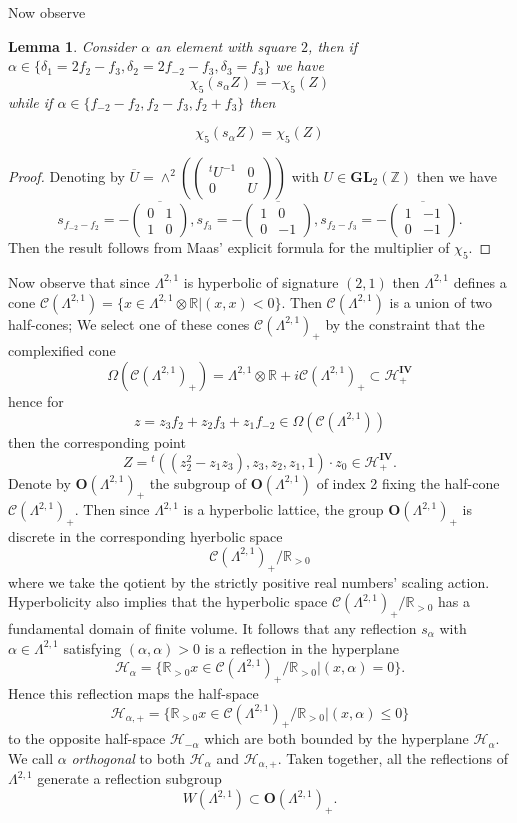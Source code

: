 \documentclass[9pt]{amsart} \usepackage[utf8]{inputenc}
\newtheorem{lemma}{Lemma}
\newcommand{\Z}{\mathbb{Z}} \newcommand{\C}{\mathbb{C}}
\newcommand{\R}{\mathbb{R}} \newcommand{\La}{\Lambda}
\newcommand{\GL}{\mathbf{GL}}
\newcommand{\Orth}{\mathbf{O}}
\newcommand{\Hpl}{\mathcal{H}}
\newcommand{\IV}{\mathbf{IV}}
\newcommand{\Cone}{\mathcal{C}}
\begin{document}
Now observe
\begin{lemma}
Consider $\alpha$ an element with square $2$, then if $\alpha \in
\{\delta_1 = 2f_2 -f_3, \delta_2 = 2f_{-2} - f_3, \delta_3 = f_3\}$ we
have
$$\chi_5(s_{\alpha}Z) = - \chi_5(Z)$$
while if $\alpha \in \{f_{-2} - f_2, f_2 - f_3, f_2 + f_3\}$ then

$$\chi_5(s_{\alpha}Z) = \chi_5(Z)$$
\end{lemma}
\begin{proof}
Denoting by $\overline{U} = \wedge^2(\begin{pmatrix}{}^tU^{-1} & 0\\ 0 &
U\end{pmatrix})$ with $U \in
\GL_2(\Z)$ then we have $$s_{f_{-2} - f_2} = -\overline{\begin{pmatrix}0
& 1\\ 1 &0\end{pmatrix}}, s_{f_3} = - \overline{\begin{pmatrix}1& 0\\  0
&-1\end{pmatrix}}, s_{f_2 - f_3} =
-\overline{\begin{pmatrix}1 & -1\\ 0 & -1\end{pmatrix}}.$$ Then the result follows from Maas' explicit
formula for the multiplier of $\chi_5.$
\end{proof}

Now observe that since $\La^{2,1}$ is hyperbolic of signature $(2,1)$
then $\La^{2,1}$ defines a cone $\Cone(\La^{2,1}) = \{ x \in \La^{2,1}
\otimes \R | (x,x) < 0\}$. Then $\Cone(\La^{2,1})$ is a union of two
half-cones; We select one of these cones $\Cone(\La^{2,1})_+$ by the
constraint that the complexified cone $$\Omega(\Cone(\La^{2,1})_+) = \La^{2,1} \otimes \R
+i\Cone(\La^{2,1})_+ \subset \Hpl^{\IV}_+$$ hence for $$z = z_3 f_2 + z_2
f_3 + z_1 f_{-2} \in \Omega(\Cone(\La^{2,1}))$$ then the corresponding
point $$Z = {}^t ((z_2^2 - z_1z_3), z_3, z_2, z_1, 1) \cdot z_0 \in
\Hpl^{\IV}_+.$$ Denote by $\Orth(\La^{2,1})_+$ the subgroup of
$\Orth(\La^{2,1})$ of index 2 fixing the half-cone
$\Cone(\Lambda^{2,1})_+$. Then since $\La^{2,1}$ is a hyperbolic
lattice, the group $\Orth(\La^{2,1})_+$ is discrete in the corresponding
hyerbolic space $$\Cone(\La^{2,1})_+ / \R_{>0}$$ where we take the
qotient by the strictly positive real numbers' scaling action.
Hyperbolicity also implies that the hyperbolic space
$\Cone(\La^{2,1})_+ / \R_{>0}$ has a fundamental domain of finite
volume. It follows that any reflection $s_{\alpha}$ with $\alpha \in
\La^{2,1}$ satisfying $(\alpha,\alpha) > 0$ is a reflection in the
hyperplane $$\Hpl_{\alpha} = \{ \R_{>0}x \in \Cone(\La^{2,1})_+/\R_{>0} |
(x,\alpha) = 0\}.$$ Hence this reflection maps the half-space
$$\Hpl_{\alpha,+} = \{\R_{>0} x \in \Cone(\La^{2,1})_+/\R_{>0} |
(x,\alpha) \leq  0\}$$ to the opposite half-space $\Hpl_{-\alpha}$ which
are both bounded by the hyperplane $\Hpl_{\alpha}$. We call $\alpha$
\textit{orthogonal} to both $\Hpl_{\alpha}$ and $\Hpl_{\alpha,+}$. Taken
together, all the reflections of $\Lambda^{2,1}$ generate a reflection
subgroup $$W(\La^{2,1}) \subset \Orth(\La^{2,1})_+.$$
\end{document}
